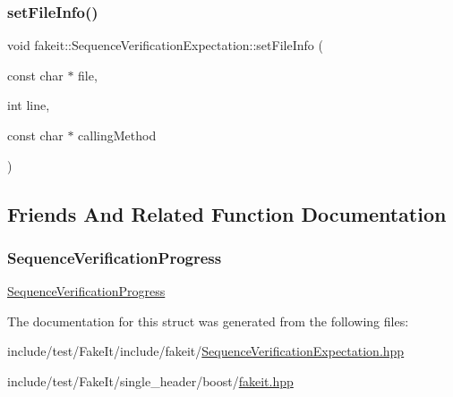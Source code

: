 \subsubsection{\texorpdfstring{setFileInfo()}{setFileInfo()}\hspace{0.1cm}{\footnotesize\ttfamily [9/9]}}
{\footnotesize\ttfamily void fakeit\+::\+Sequence\+Verification\+Expectation\+::set\+File\+Info (\begin{DoxyParamCaption}\item[{const char $\ast$}]{file,  }\item[{int}]{line,  }\item[{const char $\ast$}]{calling\+Method }\end{DoxyParamCaption})\hspace{0.3cm}{\ttfamily [inline]}}



\subsection{Friends And Related Function Documentation}
\mbox{\label{structfakeit_1_1SequenceVerificationExpectation_ae2372c6e6c2001b2f93e4f78e6bdfabc}} 
\subsubsection{\texorpdfstring{SequenceVerificationProgress}{SequenceVerificationProgress}}
{\footnotesize\ttfamily \mbox{\hyperlink{classfakeit_1_1SequenceVerificationProgress}{Sequence\+Verification\+Progress}}\hspace{0.3cm}{\ttfamily [friend]}}



The documentation for this struct was generated from the following files\+:\begin{DoxyCompactItemize}
\item 
include/test/\+Fake\+It/include/fakeit/\mbox{\hyperlink{SequenceVerificationExpectation_8hpp}{Sequence\+Verification\+Expectation.\+hpp}}\item 
include/test/\+Fake\+It/single\+\_\+header/boost/\mbox{\hyperlink{single__header_2boost_2fakeit_8hpp}{fakeit.\+hpp}}\end{DoxyCompactItemize}
